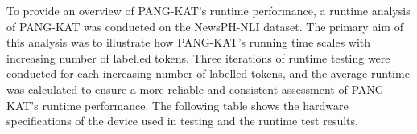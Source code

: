 \documentclass[journal]{./IEEE/IEEEtran}
\begin{document}
\begin{table}[H]

    \centering %
    \captionsetup{justification=centering}
    \caption{Performance evaluation results of PANG-KAT on Pilipino Star Ngayon articles.}  
    \label{tab:effects}
    \vspace{1mm} %
    \renewcommand{\arraystretch}{1.5}
    \fontsize{102pt}{200pt}\selectfont
\end{table}

To provide an overview of PANG-KAT’s runtime performance, a runtime analysis of PANG-KAT was conducted on the NewsPH-NLI dataset. The primary aim of this analysis was to illustrate how PANG-KAT's running time scales with increasing number of labelled tokens. Three iterations of runtime testing were conducted for each increasing number of labelled tokens, and the average runtime was calculated to ensure a more reliable and consistent assessment of PANG-KAT's runtime performance. The following table shows the hardware specifications of the device used in testing and the runtime test results.
\end{document}
